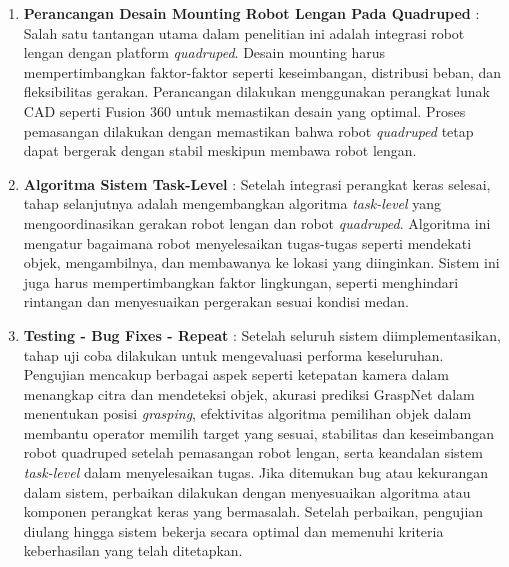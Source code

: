 \begin{enumerate}
  \item \textbf{Perancangan Desain Mounting Robot Lengan Pada Quadruped} : Salah satu tantangan utama dalam penelitian
  ini adalah integrasi robot lengan dengan platform \emph{quadruped}. Desain mounting harus mempertimbangkan faktor-faktor
  seperti keseimbangan, distribusi beban, dan fleksibilitas gerakan. Perancangan dilakukan menggunakan perangkat lunak CAD
  seperti Fusion 360 untuk memastikan desain yang optimal. Proses pemasangan dilakukan dengan memastikan bahwa robot
  \emph{quadruped} tetap dapat bergerak dengan stabil meskipun membawa robot lengan.

  \item \textbf{Algoritma Sistem Task-Level} : Setelah integrasi perangkat keras selesai, tahap selanjutnya adalah
  mengembangkan algoritma \emph{task-level} yang mengoordinasikan gerakan robot lengan dan robot \emph{quadruped}.
  Algoritma ini mengatur bagaimana robot menyelesaikan tugas-tugas seperti mendekati objek, mengambilnya, dan
  membawanya ke lokasi yang diinginkan. Sistem ini juga harus mempertimbangkan faktor lingkungan, seperti menghindari
  rintangan dan menyesuaikan pergerakan sesuai kondisi medan.

  \item \textbf{Testing - Bug Fixes - Repeat} : Setelah seluruh sistem diimplementasikan, tahap uji coba dilakukan
  untuk mengevaluasi performa keseluruhan. Pengujian mencakup berbagai aspek seperti ketepatan kamera dalam menangkap
  citra dan mendeteksi objek, akurasi prediksi GraspNet dalam menentukan posisi \emph{grasping}, efektivitas algoritma
  pemilihan objek dalam membantu operator memilih target yang sesuai, stabilitas dan keseimbangan robot quadruped setelah
  pemasangan robot lengan, serta keandalan sistem \emph{task-level} dalam menyelesaikan tugas. Jika ditemukan bug atau
  kekurangan dalam sistem, perbaikan dilakukan dengan menyesuaikan algoritma atau komponen perangkat keras yang bermasalah.
  Setelah perbaikan, pengujian diulang hingga sistem bekerja secara optimal dan memenuhi kriteria keberhasilan yang telah ditetapkan.
  
\end{enumerate}